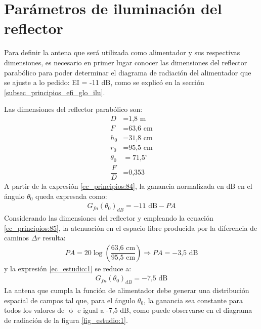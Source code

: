 
\section{Parámetros de iluminación del reflector}
\label{sec_estudio_param}

Para definir la antena que será utilizada como alimentador y sus respectivas dimensiones, es necesario en primer lugar conocer las dimensiones del reflector parabólico para poder determinar el diagrama de radiación del alimentador que se ajuste a lo pedido: EI = -11 dB, como se explicó en la sección \ref{subsec_principios_efi_glo_ilu}.

Las dimensiones del reflector parabólico son:
\begin{align*}
D &= \text{1,8 m}\\
F &= \text{63,6 cm}\\
h_0 &= \text{31,8 cm}\\
r_0 &= \text{95,5 cm}\\
\theta_0 &= \text{71,5}^{\circ}\\
\dfrac{F}{D} &= \text{0,353}
\end{align*}
A partir de la expresión \eqref{ec_principios:84}, la ganancia normalizada en dB en el ángulo $\theta_0$ queda expresada como:
\begin{align}
{G_{fn}\left(\theta_0\right)}_{dB} = -11 \text{ dB} - P\!A
\label{ec_estudio:1}
\end{align}
Considerando las dimensiones del reflector y empleando la ecuación \eqref{ec_principios:85}, la atenuación en el espacio libre producida por la diferencia de caminos $\Delta r$ resulta:
\begin{align}
P\!A = 20\log\left(\dfrac{\text{63,6 cm}}{\text{95,5 cm}}\right)\Longrightarrow P\!A = -\text{3,5 dB}
\label{ec_estudio:2}
\end{align}
y la expresión \eqref{ec_estudio:1} se reduce a:
\begin{align}
{G_{fn}\left(\theta_0\right)}_{dB} = -\text{7,5 dB}
\label{ec_estudio:3}
\end{align}
La antena que cumpla la función de alimentador debe generar una distribución espacial de campos tal que, para el ángulo $\theta_0$, la ganancia sea constante para todos los valores de $\upphi$ e igual a -7,5 dB, como puede observarse en el diagrama de radiación de la figura \ref{fig_estudio:1}.
